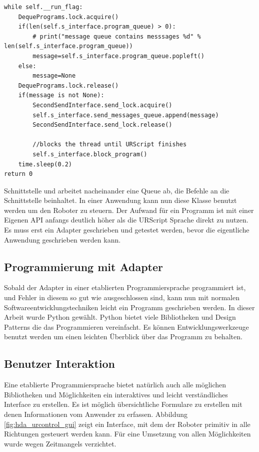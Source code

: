 \begin{lstlisting}[caption={Ausschnitt zeigt die Abarbeitung der Queue}, label=lst:adapter_queue ,captionpos=b] 
while self.__run_flag:
    DequePrograms.lock.acquire()
    if(len(self.s_interface.program_queue) > 0):
        # print("message queue contains messsages %d" % len(self.s_interface.program_queue))
        message=self.s_interface.program_queue.popleft()
    else:
        message=None
    DequePrograms.lock.release()
    if(message is not None):
        SecondSendInterface.send_lock.acquire()
        self.s_interface.send_messages_queue.append(message)
        SecondSendInterface.send_lock.release()

        //blocks the thread until URScript finishes
        self.s_interface.block_program()
    time.sleep(0.2)
return 0
\end{lstlisting}

Schnittstelle und arbeitet nacheinander eine \ac{Queue} ab, die Befehle an die Schnittstelle beinhaltet.
In einer Anwendung kann nun diese Klasse benutzt werden um den Roboter zu steuern.
Der Aufwand für ein Programm ist mit einer Eigenen API anfangs deutlich höher als die URScript Sprache direkt zu nutzen. Es muss erst ein Adapter geschrieben und getestet werden, bevor die eigentliche Anwendung geschrieben werden kann. 

\subsection{Programmierung mit Adapter}
\label{programmierung_mit_hoerherer_schicht}

Sobald der Adapter in einer etablierten Programmiersprache programmiert ist, und Fehler in diesem so gut wie ausgeschlossen sind, kann nun mit normalen Softwareentwicklungstechniken leicht ein Programm geschrieben werden. In dieser Arbeit wurde Python gewählt. Python bietet viele Bibliotheken und Design Patterns die das Programmieren vereinfacht. Es können Entwicklungswerkzeuge benutzt werden um einen leichten Überblick über das Programm zu behalten.

\subsection{Benutzer Interaktion}
\label{user_interaktion_mit_hoerherer_schicht}

Eine etablierte Programmiersprache bietet natürlich auch alle möglichen Bibliotheken und Möglichkeiten ein interaktives und leicht verständliches Interface zu erstellen. Es ist möglich übersichtliche Formulare zu erstellen mit denen Informationen vom Anwender zu erfassen. Abbildung \ref{fig:hda_urcontrol_gui} zeigt ein Interface, mit dem der Roboter primitiv in alle Richtungen gesteuert werden kann. Für eine Umsetzung von allen Möglichkeiten wurde wegen Zeitmangels verzichtet.


